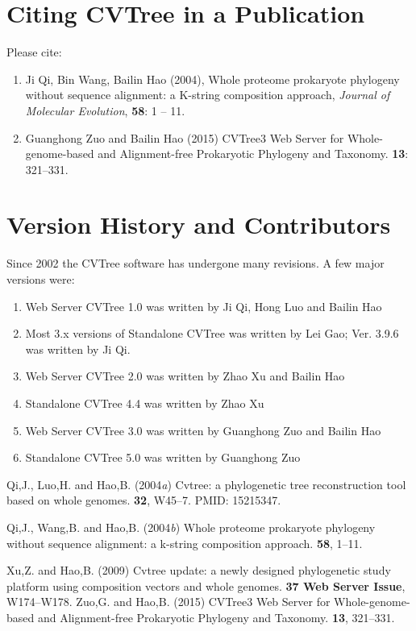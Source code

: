 \documentclass[a4paper,12pt]{article}
\begin{document}
\section{Citing CVTree in a Publication}

Please cite:
\begin{enumerate}\itemsep 0pt
\item Ji Qi, Bin Wang, Bailin Hao (2004), Whole proteome prokaryote
  phylogeny without sequence alignment: a K-string composition approach,
  {\it Journal of Molecular Evolution}, {\bf 58}: 1 -- 11.
\item Guanghong Zuo and Bailin Hao (2015) CVTree3 Web Server for Whole-genome-based and Alignment-free Prokaryotic Phylogeny and Taxonomy.
 {\bf 13}: 321--331.
\end{enumerate}


\section{Version History and Contributors}

Since 2002 the CVTree software has undergone many revisions. A few major
versions were:
\begin{enumerate}\itemsep 0pt
\item Web Server CVTree 1.0 was written by Ji Qi, Hong Luo and Bailin Hao
\item Most 3.x versions of Standalone CVTree was written by Lei Gao;
  Ver. 3.9.6 was written by Ji Qi.
\item Web Server CVTree 2.0 was written by Zhao Xu and Bailin Hao
\item Standalone CVTree 4.4 was written by Zhao Xu
\item Web Server CVTree 3.0 was written by Guanghong Zuo and Bailin Hao
\item Standalone CVTree 5.0 was written by Guanghong Zuo
\end{enumerate}

\begin{thebibliography}{}
Qi,J., Luo,H.  and Hao,B. (2004{\em{a}}) Cvtree: a phylogenetic tree
  reconstruction tool based on whole genomes.
 {\bf 32}, W45--7.
\newblock PMID: 15215347.

Qi,J., Wang,B.  and Hao,B. (2004{\em{b}}) Whole proteome prokaryote phylogeny
  without sequence alignment: a k-string composition approach.
 {\bf 58}, 1--11.

Xu,Z. and Hao,B. (2009{\em{}}) Cvtree update: a newly designed phylogenetic
  study platform using composition vectors and whole genomes.
 {\bf 37 Web Server Issue}, W174--W178.
Zuo,G. and Hao,B. (2015{\em{}}) CVTree3 Web Server for Whole-genome-based and Alignment-free Prokaryotic Phylogeny and Taxonomy.
 {\bf 13}, 321--331.
\end{thebibliography}
\end{document}
